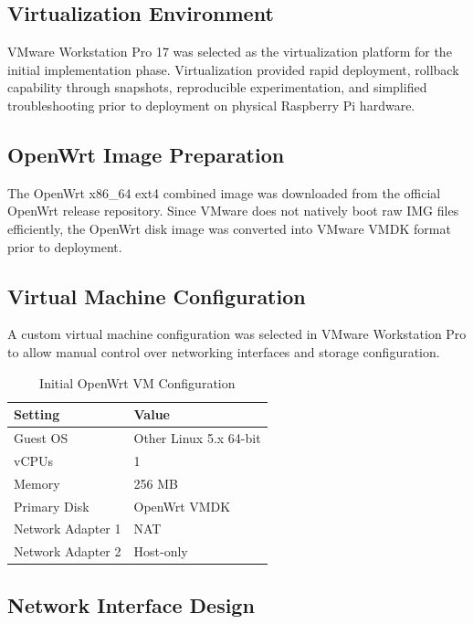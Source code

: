 \documentclass[conference]{IEEEtran}
\begin{document}
\subsection{Virtualization Environment}

VMware Workstation Pro 17 was selected as the virtualization platform for the initial implementation phase. Virtualization provided rapid deployment, rollback capability through snapshots, reproducible experimentation, and simplified troubleshooting prior to deployment on physical Raspberry Pi hardware.

\subsection{OpenWrt Image Preparation}

The OpenWrt x86\_64 ext4 combined image was downloaded from the official OpenWrt release repository. Since VMware does not natively boot raw IMG files efficiently, the OpenWrt disk image was converted into VMware VMDK format prior to deployment.

\subsection{Virtual Machine Configuration}

A custom virtual machine configuration was selected in VMware Workstation Pro to allow manual control over networking interfaces and storage configuration.

\begin{table}[H]
\centering
\caption{Initial OpenWrt VM Configuration}
\begin{tabular}{|l|l|}
\hline
Setting & Value \\ \hline
Guest OS & Other Linux 5.x 64-bit \\ \hline
vCPUs & 1 \\ \hline
Memory & 256 MB \\ \hline
Primary Disk & OpenWrt VMDK \\ \hline
Network Adapter 1 & NAT \\ \hline
Network Adapter 2 & Host-only \\ \hline
\end{tabular}
\end{table}

\subsection{Network Interface Design}
\end{document}
